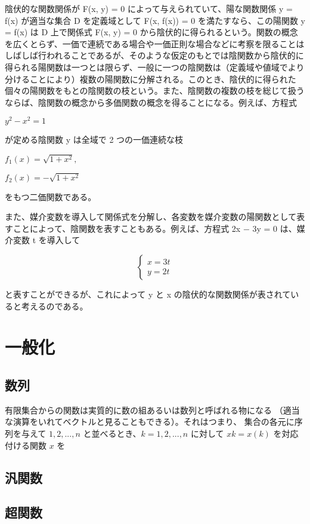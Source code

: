 \documentclass[a4j,12pt]{jreport}
\begin{document}
陰伏的な関数関係が F(x, y) = 0 によって与えられていて、陽な関数関係 y = f(x) が適当な集合 D を定義域として F(x, f(x)) = 0 を満たすなら、この陽関数 y = f(x) は D 上で関係式 F(x, y) = 0 から陰伏的に得られるという。関数の概念を広くとらず、一価で連続である場合や一価正則な場合などに考察を限ることはしばしば行われることであるが、そのような仮定のもとでは陰関数から陰伏的に得られる陽関数は一つとは限らず、一般に一つの陰関数は（定義域や値域でより分けることにより）複数の陽関数に分解される。このとき、陰伏的に得られた個々の陽関数をもとの陰関数の枝という。また、陰関数の複数の枝を総じて扱うならば、陰関数の概念から多価関数の概念を得ることになる。例えば、方程式

$y^2 - x^2 = 1$

が定める陰関数 y は全域で 2 つの一価連続な枝

$f_1(x)=\sqrt{1 + x^2} ,$

$f_2(x)=- \sqrt{1 + x^2}$

をもつ二価関数である。

また、媒介変数を導入して関係式を分解し、各変数を媒介変数の陽関数として表すことによって、陰関数を表すこともある。例えば、方程式 2x − 3y = 0 は、媒介変数 t を導入して

$$
\begin{cases}
x = 3t\\
y = 2t
\end{cases}
$$

と表すことができるが、これによって y と x の陰伏的な関数関係が表されていると考えるのである。


\section{一般化}
\subsection{数列}
有限集合からの関数は実質的に数の組あるいは数列と呼ばれる物になる
（適当な演算をいれてベクトルと見ることもできる）。それはつまり、
集合の各元に序列を与えて ${1, 2, ..., n}$ と並べるとき、$k = 1, 2, ..., n$ に対して $xk = x(k)$ を対応付ける関数 $x$ を

\subsection{汎関数}
\subsection{超関数}
\end{document}
